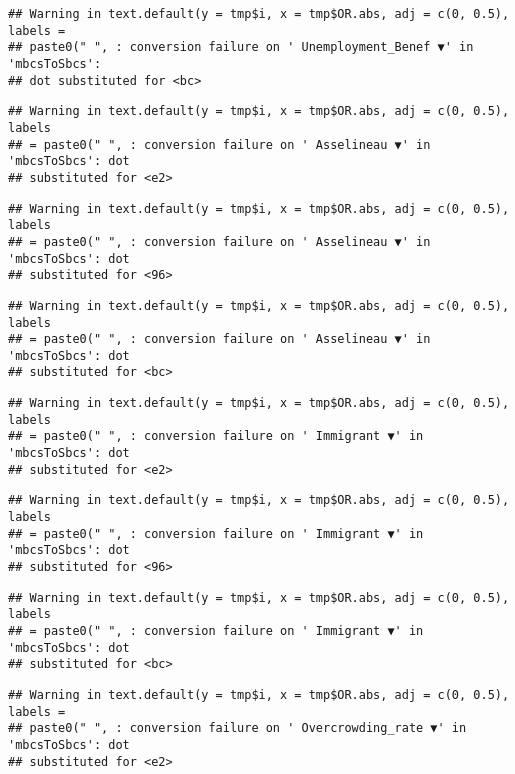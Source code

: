 \documentclass[
]{article}
\begin{document}
\begin{verbatim}
## Warning in text.default(y = tmp$i, x = tmp$OR.abs, adj = c(0, 0.5), labels =
## paste0(" ", : conversion failure on ' Unemployment_Benef ▼' in 'mbcsToSbcs':
## dot substituted for <bc>
\end{verbatim}

\begin{verbatim}
## Warning in text.default(y = tmp$i, x = tmp$OR.abs, adj = c(0, 0.5), labels
## = paste0(" ", : conversion failure on ' Asselineau ▼' in 'mbcsToSbcs': dot
## substituted for <e2>
\end{verbatim}

\begin{verbatim}
## Warning in text.default(y = tmp$i, x = tmp$OR.abs, adj = c(0, 0.5), labels
## = paste0(" ", : conversion failure on ' Asselineau ▼' in 'mbcsToSbcs': dot
## substituted for <96>
\end{verbatim}

\begin{verbatim}
## Warning in text.default(y = tmp$i, x = tmp$OR.abs, adj = c(0, 0.5), labels
## = paste0(" ", : conversion failure on ' Asselineau ▼' in 'mbcsToSbcs': dot
## substituted for <bc>
\end{verbatim}

\begin{verbatim}
## Warning in text.default(y = tmp$i, x = tmp$OR.abs, adj = c(0, 0.5), labels
## = paste0(" ", : conversion failure on ' Immigrant ▼' in 'mbcsToSbcs': dot
## substituted for <e2>
\end{verbatim}

\begin{verbatim}
## Warning in text.default(y = tmp$i, x = tmp$OR.abs, adj = c(0, 0.5), labels
## = paste0(" ", : conversion failure on ' Immigrant ▼' in 'mbcsToSbcs': dot
## substituted for <96>
\end{verbatim}

\begin{verbatim}
## Warning in text.default(y = tmp$i, x = tmp$OR.abs, adj = c(0, 0.5), labels
## = paste0(" ", : conversion failure on ' Immigrant ▼' in 'mbcsToSbcs': dot
## substituted for <bc>
\end{verbatim}

\begin{verbatim}
## Warning in text.default(y = tmp$i, x = tmp$OR.abs, adj = c(0, 0.5), labels =
## paste0(" ", : conversion failure on ' Overcrowding_rate ▼' in 'mbcsToSbcs': dot
## substituted for <e2>
\end{verbatim}
\end{document}
